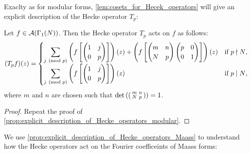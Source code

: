       Exaclty as for modular forms, \cref{lem:cosets_for_Hecek_operators} will give an explicit description of the Hecke operator $T_{p}$:

      \begin{proposition}\label{prop:explicit_description_of_Hecke_operators_Maass}
        Let $f \in \mathcal{A}(\Gamma_{1}(N))$. Then the Hecke operator $T_{p}$ acts on $f$ as follows:
        \[
          (T_{p}f)(z) = \begin{cases} \displaystyle{\sum_{j \ \left(\text{mod }p\right)}}\left(f\left[\begin{pmatrix} 1 & j \\ 0 & p \end{pmatrix}\right]\right)(z)+\left(f\left[\begin{pmatrix} m & n \\ N & p \end{pmatrix}\begin{pmatrix} p & 0 \\ 0 & 1 \end{pmatrix}\right]\right)(z) & \text{if $p \nmid N$}, \\ \displaystyle{\sum_{j \ \left(\text{mod }p\right)}}\left(f\left[\begin{pmatrix} 1 & j \\ 0 & p \end{pmatrix}\right]\right)(z) & \text{if $p \mid N$}, \end{cases}
        \]
        where $m$ and $n$ are chosen such that $\det\left(\begin{psmallmatrix} m & n \\ N & p \end{psmallmatrix}\right) = 1$.
      \end{proposition}
      \begin{proof}
        Repeat the proof of \cref{prop:explicit_description_of_Hecke_operators_modular}.
      \end{proof}

      We use \cref{prop:explicit_description_of_Hecke_operators_Maass} to understand how the Hecke operators act on the Fourier coefficeints of Maass forms:

